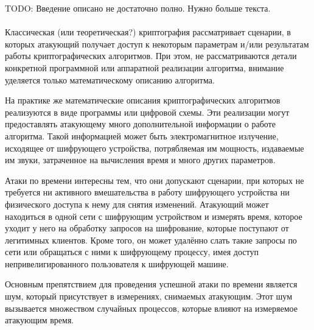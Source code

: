 TODO: Введение описано не достаточно полно. Нужно больше текста. \\
\\

Классическая (или теоретическая?) криптография рассматривает сценарии, в
которых атакующий получает доступ к некоторым параметрам и/или результатам
работы криптографических алгоритмов. При этом, не рассматриваются детали
конкретной программной или аппаратной реализации алгоритма, внимание уделяется
только математическому описанию алгоритма.

На практике же математические описания криптографических алгоритмов реализуются
в виде программы или цифровой схемы. Эти реализации могут предоставлять атакующему
много дополнительной информации о работе алгоритма. Такой информацией может быть
электромагнитное излучение, исходящее от шифрующего устройства, потрябляемая им
мощность, издаваемые им звуки, затраченное на вычисления время и много других
параметров.

Атаки по времени интересны тем, что они допускают сценарии, при которых не
требуется ни активного вмешательства в
работу шифрующего устройства ни физического доступа к нему для снятия изменений.
Атакующий может находиться в одной сети с шифрующим устройством и измерять
время, которое уходит у него на обработку запросов на шифрование, которые
поступают от легитимных клиентов. Кроме того, он может удалённо слать такие
запросы по сети или обращаться с ними к шифрующему процессу, имея доступ
непривелигированного пользователя к шифрующей машине.

Основным препятствием для проведения успешной атаки по времени является шум,
который присутствует в измерениях, снимаемых атакующим. Этот шум вызывается
множеством случайных процессов, которые влияют на измеряемое атакующим время.
